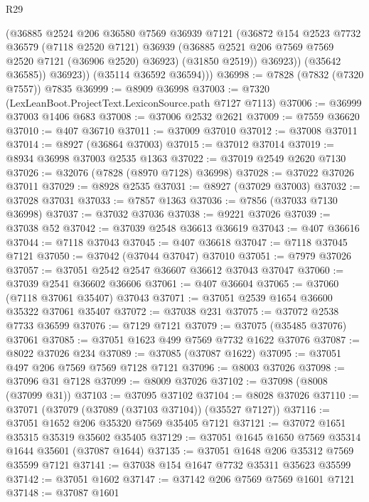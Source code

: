 \begin{lexlean}{R29}
\begin{coremodule}
                (@36885
                  @2524
                  @206
                  @36580
                  @7569
                  @36939
                  @7121
                  (@36872
                    @154
                    @2523
                    @7732
                    @36579
                    (@7118 @2520 @7121)
                    @36939
                    (@36885 @2521 @206 @7569 @7569 @2520 @7121 (@36906 @2520) @36923)
                    (@31850 @2519))
                  @36923))
              (@35642 @36585))
            @36923))
        (@35114 @36592 @36594)))
@36998 := @7828 (@7832 (@7320 @7557)) @7835
@36999 := @8909 @36998
@37003 := @7320 (LexLeanBoot.ProjectText.LexiconSource.path @7127 @7113)
@37006 := @36999 @37003 @1406 @683
@37008 := @37006 @2532 @2621
@37009 := @7559 @36620
@37010 := @407 @36710
@37011 := @37009 @37010
@37012 := @37008 @37011
@37014 := @8927 (@36864 @37003)
@37015 := @37012 @37014
@37019 := @8934 @36998 @37003 @2535 @1363
@37022 := @37019 @2549 @2620 @7130
@37026 := @32076 (@7828 (@8970 @7128) @36998)
@37028 := @37022 @37026 @37011
@37029 := @8928 @2535
@37031 := @8927 (@37029 @37003)
@37032 := @37028 @37031
@37033 := @7857 @1363
@37036 := @7856 (@37033 @7130 @36998)
@37037 := @37032 @37036
@37038 := @9221 @37026
@37039 := @37038 @52
@37042 := @37039 @2548 @36613 @36619
@37043 := @407 @36616
@37044 := @7118 @37043
@37045 := @407 @36618
@37047 := @7118 @37045 @7121
@37050 := @37042 (@37044 @37047) @37010
@37051 := @7979 @37026
@37057 := @37051 @2542 @2547 @36607 @36612 @37043 @37047
@37060 := @37039 @2541 @36602 @36606
@37061 := @407 @36604
@37065 := @37060 (@7118 @37061 @35407) @37043
@37071 := @37051 @2539 @1654 @36600 @35322 @37061 @35407
@37072 := @37038 @231
@37075 := @37072 @2538 @7733 @36599
@37076 := @7129 @7121
@37079 := @37075 (@35485 @37076) @37061
@37085 := @37051 @1623 @499 @7569 @7732 @1622 @37076
@37087 := @8022 @37026 @234
@37089 := @37085 (@37087 @1622)
@37095 := @37051 @497 @206 @7569 @7569 @7128 @7121
@37096 := @8003 @37026
@37098 := @37096 @31 @7128
@37099 := @8009 @37026
@37102 := @37098 (@8008 (@37099 @31))
@37103 := @37095 @37102
@37104 := @8028 @37026
@37110 := @37071 (@37079 (@37089 (@37103 @37104)) (@35527 @7127))
@37116 := @37051 @1652 @206 @35320 @7569 @35405 @7121
@37121 := @37072 @1651 @35315 @35319 @35602 @35405
@37129 := @37051 @1645 @1650 @7569 @35314 @1644 @35601 (@37087 @1644)
@37135 := @37051 @1648 @206 @35312 @7569 @35599 @7121
@37141 := @37038 @154 @1647 @7732 @35311 @35623 @35599
@37142 := @37051 @1602
@37147 := @37142 @206 @7569 @7569 @1601 @7121
@37148 := @37087 @1601

\end{coremodule}
\end{lexlean}
